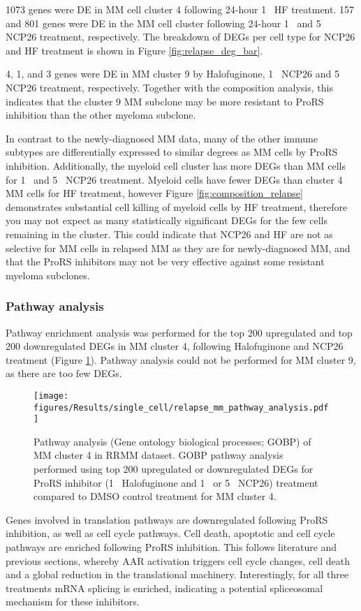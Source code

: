 1073 genes were DE in MM cell cluster 4 following 24-hour 1\si{\micro\Molar} HF treatment.
157 and 801 genes were DE in the MM cell cluster following 24-hour 1\si{\micro\Molar}  and 5\si{\micro\Molar} NCP26 treatment, respectively.
The breakdown of DEGs per cell type for NCP26 and HF treatment is shown in Figure \ref{fig:relapse_deg_bar}.

4, 1, and 3 genes were DE in MM cluster 9 by Halofuginone, 1\si{\micro\Molar} NCP26  and 5\si{\micro\Molar} NCP26 treatment, respectively.
Together with the composition analysis, this indicates that the cluster 9 MM subclone may be more resistant to ProRS inhibition than the other myeloma subclone.

In contrast to the newly-diagnosed MM data, many of the other immune subtypes are differentially expressed to similar degrees as MM cells by ProRS inhibition.
Additionally, the myeloid cell cluster has more DEGs than MM cells for 1\si{\micro\Molar} and 5\si{\micro\Molar}  NCP26 treatment.
Myeloid cells have fewer DEGs than cluster 4 MM cells for HF treatment, however Figure \ref{fig:composition_relapse} demonstrates substantial cell killing of myeloid cells by HF treatment, therefore you may not expect as many statistically significant DEGs for the few cells remaining in the cluster.
This could indicate that NCP26 and HF are not as selective for MM cells in relapsed MM as they are for newly-diagnosed MM, and that the ProRS inhibitors may not be very effective against some resistant myeloma subclones.

\subsubsection{Pathway analysis}
Pathway enrichment analysis was performed for the top 200 upregulated and top 200 downregulated DEGs in MM cluster 4, following Halofuginone and NCP26 treatment (Figure \ref{fig:relapse_mm_pathway_analysis}).
Pathway analysis could not be performed for MM cluster 9, as there are too few DEGs.
\begin{figure}[htb]
\centering
\texttt{[image: figures/Results/single\_cell/relapse\_mm\_pathway\_analysis.pdf]}
\caption[scRNA-seq MM cluster pathway analysis (relapsed MM)]{Pathway analysis (Gene ontology biological processes; GOBP) of MM cluster 4 in RRMM dataset.
GOBP pathway analysis performed using top 200 upregulated or downregulated DEGs for ProRS inhibitor (1\si{\micro\Molar} Halofuginone and 1\si{\micro\Molar} or 5\si{\micro\Molar}  NCP26) treatment compared to DMSO control treatment for MM cluster 4.
}
\label{fig:relapse_mm_pathway_analysis}
\end{figure}
Genes involved in translation pathways are downregulated following ProRS inhibition, as well as cell cycle pathways.
Cell death, apoptotic and cell cycle pathways are enriched following ProRS inhibition.
This follows literature and previous sections, whereby AAR activation triggers cell cycle changes, cell death and a global reduction in the translational machinery.
Interestingly, for all three treatments mRNA splicing is enriched, indicating a potential spliceosomal mechanism for these inhibitors.

